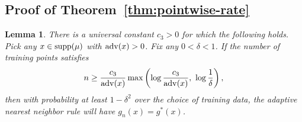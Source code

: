 \documentclass{article}
\def\supp{{\rm supp}}
\def\adv{{\rm adv}}
\newtheorem{lemma}[theorem]{Lemma}
\newcommand{\comment}[3]{{\color{#1} {\bf #2 :} #3}}
\newcommand{\shay}[1]{\comment{purple}{Shay}{#1}}
\begin{document}

\subsection{Proof of Theorem~\ref{thm:pointwise-rate}}

\begin{lemma}
There is a universal constant $c_3 > 0$ for which the following holds. Pick any $x \in \supp(\mu)$ with $\adv(x) > 0$. Fix any $0 < \delta < 1$. If the number of training points satisfies
$$ n \geq \frac{c_3}{\adv(x)} \max\left(\log \frac{c_3}{\adv(x)}, \ \log \frac{1}{\delta} \right), $$
then with probability at least $1-\delta^2$ over the choice of training data, the adaptive nearest neighbor rule will have $g_n(x) = g^*(x)$.
\label{lemma:pointwise}
\end{lemma}
\end{document}
